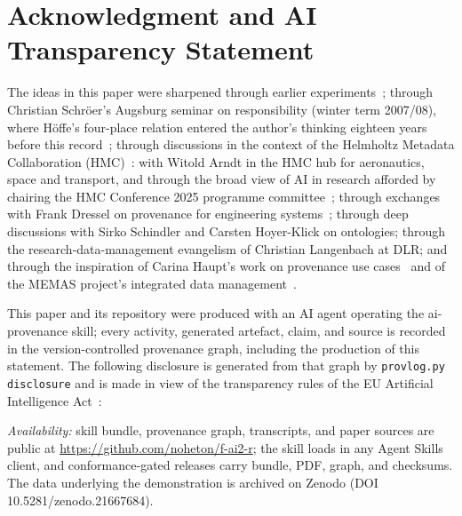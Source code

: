 \documentclass[conference]{IEEEtran}
\begin{document}
\section*{Acknowledgment and AI Transparency Statement}
The ideas in this paper were sharpened through earlier
experiments~\cite{obscurity-is-dead, fair2r-repo}; through
Christian Schr\"oer's Augsburg seminar on responsibility (winter
term 2007/08), where H\"offe's four-place relation entered the
author's thinking eighteen years before this
record~\cite{verantwortung2008}; through discussions
in the context of the Helmholtz Metadata Collaboration
(HMC)~\cite{hmc}: with Witold Arndt in the HMC hub for
aeronautics, space and transport, and through the broad view of AI in
research afforded by chairing the HMC Conference 2025 programme
committee~\cite{hmc-conference2025}; through exchanges with Frank
Dressel on provenance for engineering
systems~\cite{uncertainty-prov2026}; through deep discussions with
Sirko Schindler and Carsten Hoyer-Klick on ontologies; through the
research-data-management evangelism of Christian Langenbach at DLR;
and through the inspiration of Carina Haupt's work on provenance
use cases~\cite{provenance-overview2022} and of the MEMAS project's
integrated data management~\cite{memas2024}.

This paper and its repository were produced with an AI agent operating
the ai-provenance skill; every activity, generated artefact, claim, and
source is recorded in the version-controlled provenance graph,
including the production of this statement. The following disclosure is
generated from that graph by \texttt{provlog.py disclosure} and is made
in view of the transparency rules of the EU Artificial Intelligence
Act~\cite{eu-ai-act2024}:

\begingroup\itshape

\endgroup

\emph{Availability:} skill bundle, provenance graph, transcripts,
and paper sources are public at
\url{https://github.com/noheton/f-ai2-r}; the skill loads in any
Agent Skills client, and conformance-gated releases carry bundle,
PDF, graph, and checksums. The data underlying the demonstration is
archived on Zenodo (DOI 10.5281/zenodo.21667684).



\end{document}
